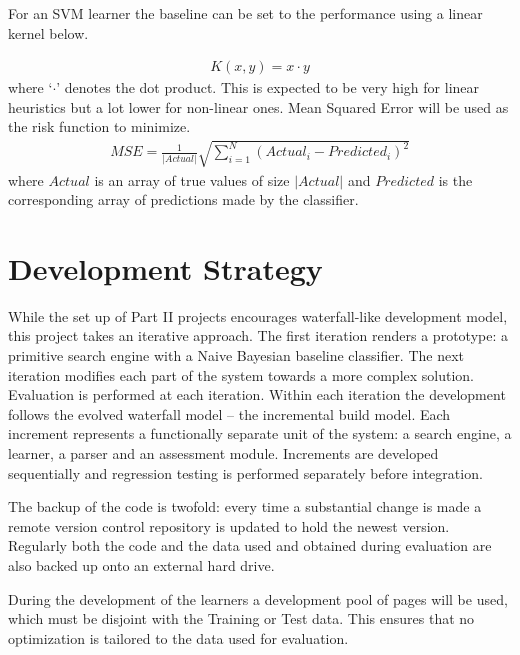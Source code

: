 \documentclass[11pt,twoside,notitlepage]{report}
\begin{document}
For an SVM learner the baseline can be set to the performance using a linear
kernel below.

\begin{gather*}
K(x,y) = x \cdot y
\end{gather*}
where `\(\cdot\)' denotes the dot product.
This is expected to be very high for linear heuristics but a lot lower for
non-linear ones.
Mean Squared Error will be used as the risk function to minimize.
\begin{gather*}
  MSE = \frac{1}{|Actual|}\sqrt{\sum_{i=1}^{N}(Actual_i - Predicted_i)^2}
\end{gather*}
where \(Actual\) is an array of true values of size \(|Actual|\) and
\(Predicted\) is the corresponding array of predictions made by the classifier.

\section{Development Strategy}
While the set up of Part II projects encourages waterfall-like development
model, this project takes an iterative approach. The first iteration renders a
prototype: a primitive search engine with a Naive Bayesian baseline classifier.
The next iteration modifies each part of the system towards a more complex
solution. Evaluation is performed at each iteration. Within each  iteration the
development follows the evolved waterfall model -- the incremental build model.
Each increment represents a functionally separate unit of the system: a search
engine, a learner, a parser and an assessment module. Increments are developed
sequentially and regression testing is performed separately before
integration.

The backup of the code is twofold: every time a substantial change is made a remote
version control repository is updated to hold the newest version. Regularly both the code and
the data used and obtained during evaluation are also backed up onto an
external hard drive.

During the development of the learners a development pool of pages will
be used, which must be disjoint with the Training or Test data. This ensures
that no optimization is tailored to the data used for evaluation. 
\end{document}
